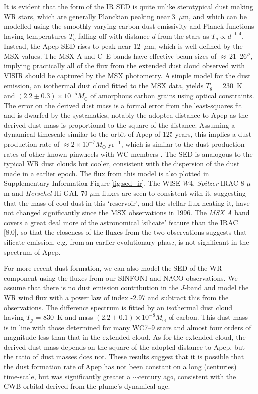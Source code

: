 \documentclass[preprint,times]{aastex61}
\begin{document}
It is evident that the form of the IR SED is quite unlike sterotypical dust making WR stars, which are generally Planckian  peaking near 3~$\mu$m, and which can be modelled using the smoothly varying carbon dust emissivity and Planck functions having temperatures $T_g$ falling off with distance $d$ from the stars as \citep{WHT} $T_g \propto d^{-0.4}$. Instead, the Apep SED rises to peak near 12~$\mu$m, which is well defined by the MSX values. The MSX A and C--E bands have effective beam sizes of $\approx$\,21--26$''$, implying practically all of the flux from the extended dust cloud observed with VISIR should be captured by the MSX photometry. A simple model for the dust emission, an isothermal dust cloud fitted to the MSX data, yields $T_g$ = 230~K and $(2.2\pm0.3) \times 10^{-5} M_{\odot}$ of amorphous carbon grains using optical constraints\citep{ZubkoC}. The error on the derived dust mass is a formal error from the least-squares fit and is dwarfed by the systematics, notably the adopted distance to Apep as the derived dust mass is proportional to the square of the distance. Assuming a dynamical timescale similar to the orbit of Apep of 125 years, this implies a dust production rate of $\approx 2 \times 10^{-7} M_{\odot}~\mathrm{yr^{-1}}$, which is similar to the dust production rates of other known pinwheels with WC members \cite{Williams2009}. The SED is analogous to the typical WR dust clouds but cooler, consistent with the dispersion of the dust made in a earlier epoch. The flux from this model is also plotted in Supplementary Information Figure\,\ref{fig:sed_ir}. The WISE $W4$, {\em Spitzer} IRAC 8-$\mu$m and \emph{Herschel} Hi-GAL 70-$\mu$m fluxes are seen to consistent with it, suggesting that the mass of cool dust in this `reservoir', and the stellar flux heating it, have not changed significantly since the MSX observations in 1996. The {\em MSX} $A$ band covers a great deal more of the astronomical `silicate' feature than the IRAC [8.0], so that the closeness of the fluxes from the two observations suggests that silicate emission, e.g. from an earlier evolutionary phase, is not significant in the spectrum of Apep.

For more recent dust formation, we can also model the SED of the WR component using the fluxes from our SINFONI and NACO observations. We assume that there is no dust emission contribution in the $J$-band and model the WR wind flux with a power law of index -2.97 \citep{Morris} and subtract this from the observations. The difference spectrum is fitted by an isothermal dust cloud having $T_g$ = 830~K and mass $(2.2\pm0.1) \times 10^{-8} M_{\odot}$ of carbon. This dust mass is in line with those determined for many WC7--9 stars \citep{WHT} and almost four orders of magnitude less than that in the extended cloud. As for the extended cloud, the derived dust mass depends on the square of the adopted distance to Apep, but the ratio of dust masses does not. These results suggest that it is possible that the dust formation rate of Apep has not been constant on a long (centuries) time-scale, but was significantly greater a $\sim$century ago, consistent with the CWB orbital derived from the plume's dynamical age.
\end{document}
